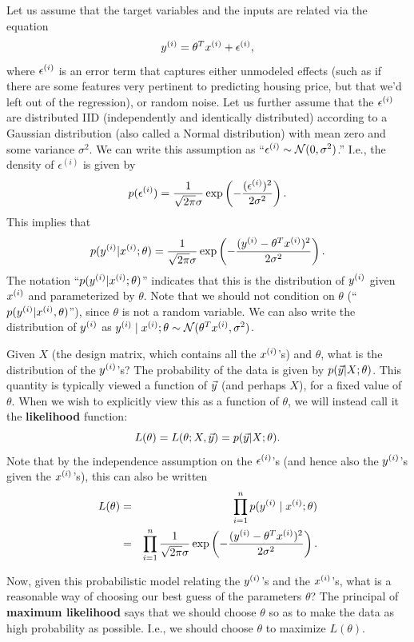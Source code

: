 \documentclass{article}
\begin{document}
Let us assume that the target variables and the inputs are related via the equation
\[
y^{(i)} = \theta^T x^{(i)} + {\epsilon^{(i)}},
\]
where ${\epsilon^{(i)}}$ is an error term that captures either
unmodeled effects (such as if there are some features very pertinent
to predicting housing price, but that we'd left out of the regression),
or random noise.  Let us further assume that the ${\epsilon^{(i)}}$ are
distributed IID (independently and identically distributed) according
to a Gaussian distribution (also called a Normal distribution)
with mean zero and some variance $\sigma^2$.
We can write this assumption as ``${\epsilon^{(i)}} \sim {\cal N}(0,\sigma^2)$.''
I.e., the density of
$\epsilon^{(i)}$ is given by
\[
p({\epsilon^{(i)}}) = \frac{1}{\sqrt{2\pi}\sigma} \exp\left(-\frac{({\epsilon^{(i)}})^2}{2\sigma^2}\right).
\]
This implies that
\[
p({y^{(i)}}|{x^{(i)}};\theta) = \frac{1}{\sqrt{2\pi}\sigma} \exp\left(-\frac{({y^{(i)}} - \theta^T{x^{(i)}})^2}{2\sigma^2}\right).
\]
The notation ``$p({y^{(i)}}|{x^{(i)}};\theta)$'' indicates that this is the distribution
of ${y^{(i)}}$ given ${x^{(i)}}$ and parameterized by $\theta$.  Note that we should
not condition on $\theta$ (``$p({y^{(i)}}|{x^{(i)}},\theta)$''), since $\theta$ is not
a random variable.  We can also write the distribution of ${y^{(i)}}$ as
${y^{(i)}}\mid{x^{(i)}};\theta\sim{\cal N}(\theta^T{x^{(i)}},\sigma^2)$.

Given $X$ (the design matrix, which contains all the ${x^{(i)}}$'s) and $\theta$,
what is the distribution of the ${y^{(i)}}$'s?  The probability of the data is
given by $p({\vec{y}}|X;\theta)$.  This quantity is typically viewed a function
of ${\vec{y}}$ (and perhaps $X$), for a fixed value of $\theta$.  When we wish
to explicitly view this as a function of $\theta$, we will instead call it
the {\bf likelihood} function:
\[
L(\theta) = L(\theta; X, {\vec{y}}) = p({\vec{y}} | X;\theta).
\]
Note that by the independence assumption on the ${\epsilon^{(i)}}$'s (and hence also the ${y^{(i)}}$'s
given the ${x^{(i)}}$'s), this can also be written
\begin{eqnarray*}
L(\theta) &=& \prod_{i=1}^{n} p({y^{(i)}} \mid {x^{(i)}}; \theta) \\
&=& \prod_{i=1}^{n} \frac{1}{\sqrt{2\pi}\sigma} \exp\left(-\frac{({y^{(i)}} - \theta^T{x^{(i)}})^2}{2\sigma^2}\right).
\end{eqnarray*}

Now, given this probabilistic model relating the ${y^{(i)}}$'s and the ${x^{(i)}}$'s, what is
a reasonable way of choosing our best guess of the parameters $\theta$?  The
principal of {\bf maximum likelihood} says that we should choose
$\theta$ so as to make the data as high probability as possible.  I.e., we should
choose $\theta$ to maximize $L(\theta)$.
\end{document}
